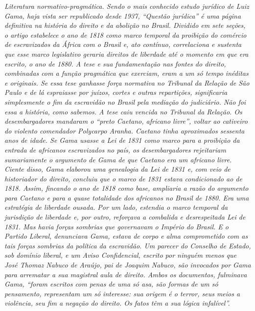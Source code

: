 \begin{resumo} %
\emph{Literatura normativo-pragmática. Sendo o mais conhecido estudo
jurídico de Luiz Gama, haja vista ser republicado desde 1937, ``Questão
jurídica'' é uma página definitiva na história do direito e da
abolição no Brasil. Dividido em sete seções, o artigo estabelece o ano
de 1818 como marco temporal da proibição do comércio de escravizados da
África com o Brasil e, ato contínuo, correlaciona e sustenta que esse
marco legislativo geraria direitos de liberdade até o momento em que era
escrito, o ano de 1880. A tese e sua fundamentação nas fontes do
direito, combinadas com a função pragmática que exerciam, eram a um só
tempo inéditas e originais. Se essa tese ganhasse força normativa no
Tribunal da Relação de São Paulo e de lá espraiasse por juízos, cortes e
outras repartições, significaria simplesmente o fim da escravidão no
Brasil pela mediação do judiciário. Não foi essa a história, como
sabemos. A tese caiu vencida no Tribunal da Relação. Os desembargadores
mandaram o ``preto Caetano, africano livre'', voltar ao cativeiro do
violento comendador Polycarpo Aranha. Caetano tinha aproximados sessenta
anos de idade. Se Gama usasse a Lei de 1831 como marco para a proibição
da entrada de africanos escravizados no país, os desembargadores
rejeitariam sumariamente o argumento de Gama de que Caetano era um
africano livre. Ciente disso, Gama elaborou uma genealogia da Lei de
1831 e, com veio de historiador do direito, concluiu que o marco de 1831
estava condicionado ao de 1818. Assim, fincando o ano de 1818 como base,
ampliaria a razão do argumento para Caetano e para a quase totalidade
dos africanos no Brasil de 1880. Era uma estratégia de liberdade ousada.
Por um lado, estendia o marco temporal da jurisdição de liberdade e, por
outro, reforçava a combalida e desrespeitada Lei de 1831. Mas havia
forças sombrias que governavam o Império do Brasil. E o Partido Liberal,
denunciava Gama, estava de corpo e alma comprometido com as tais forças
sombrias da política da escravidão. Um parecer do Conselho de Estado,
sob domínio liberal, e um Aviso Confidencial, escrito por ninguém menos
que José Thomaz Nabuco de Araújo, pai de Joaquim Nabuco, são invocados
por Gama para arrematar a sua magistral aula de direito. Ambos os
documentos, fulminava Gama, ``foram escritos com penas de uma só asa, são
formas de um só pensamento, representam um só interesse: sua origem é o
terror, seus meios a violência, seu fim a negação do direito. Os fatos têm
a sua lógica infalível''. }
\end{resumo}

